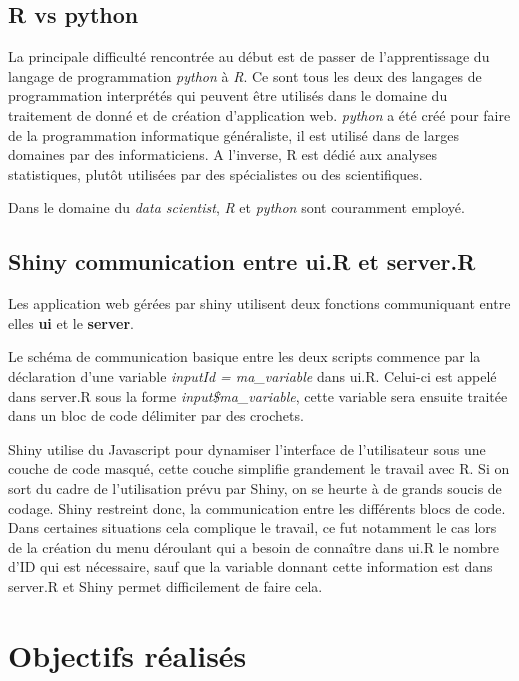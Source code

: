 \documentclass[]{report}
\begin{document}
\subsection{R vs python}\label{r-vs-python}

La principale difficulté rencontrée au début est de passer de
l'apprentissage du langage de programmation \emph{python} à \emph{R}. Ce
sont tous les deux des langages de programmation interprétés qui peuvent
être utilisés dans le domaine du traitement de donné et de création
d'application web. \emph{python} a été créé pour faire de la
programmation informatique généraliste, il est utilisé dans de larges
domaines par des informaticiens. A l'inverse, R est dédié aux analyses
statistiques, plutôt utilisées par des spécialistes ou des
scientifiques.

Dans le domaine du \emph{data scientist}, \emph{R} et \emph{python} sont
couramment employé.

\subsection{Shiny communication entre ui.R et
server.R}\label{shiny-communication-entre-ui.r-et-server.r}

Les application web gérées par shiny utilisent deux fonctions
communiquant entre elles \textbf{ui} et le \textbf{server}.

Le schéma de communication basique entre les deux scripts commence par
la déclaration d'une variable \emph{inputId = ma\_variable} dans ui.R.
Celui-ci est appelé dans server.R sous la forme
\emph{input\$ma\_variable}, cette variable sera ensuite traitée dans un
bloc de code délimiter par des crochets.

Shiny utilise du Javascript pour dynamiser l'interface de l'utilisateur
sous une couche de code masqué, cette couche simplifie grandement le
travail avec R. Si on sort du cadre de l'utilisation prévu par Shiny, on
se heurte à de grands soucis de codage. Shiny restreint donc, la
communication entre les différents blocs de code. Dans certaines
situations cela complique le travail, ce fut notamment le cas lors de la
création du menu déroulant qui a besoin de connaître dans ui.R le nombre
d'ID qui est nécessaire, sauf que la variable donnant cette information
est dans server.R et Shiny permet difficilement de faire cela.

\section{Objectifs réalisés}\label{objectifs-realises}
\end{document}
